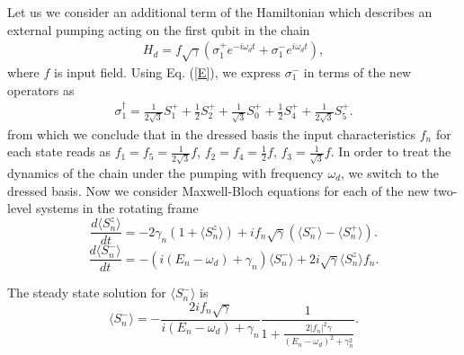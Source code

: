 \documentclass[%
 aps, pra,
 amsmath,amssymb,
 preprint,%
superscriptaddress
]{revtex4-2}
\begin{document}
Let us we consider an additional term of the Hamiltonian which
describes an external pumping acting on the first qubit in the
chain
\begin{eqnarray}
H_{d} =f \sqrt{\gamma}(\sigma_1^{+} e^{-i \omega_d t} + \sigma_1^{-} e^{i \omega_d t}),
\label{Hint}
\end{eqnarray}
where $f$ is input field. Using Eq. (\ref{E}), we express $\sigma_1^{-}$ in terms of the new operators
as
\begin{eqnarray}
\sigma_1^{\dagger}=\frac{1}{2\sqrt{3}}S_1^{+} + \frac{1}{2}S_2^{+} + \frac{1}{\sqrt{3}}S_0^{+} + \frac{1}{2}S_4^{+} + \frac{1}{2\sqrt{3}}S_5^{+}.
\label{sigma1}
\end{eqnarray}
from which we conclude that in the dressed basis the input
characteristics $f_{n}$ for each state reads as $f_{1}=f_{5}=\frac{1}{2\sqrt{3}}f$, $f_{2}=f_{4}=\frac{1}{2}f$, $f_{3}=\frac{1}{\sqrt{3}}f$. In order to treat the dynamics of the chain under the pumping with frequency $\omega_d$,
we switch to the
dressed basis. Now we consider Maxwell-Bloch equations for each of the new
two-level systems in the rotating frame
\begin{equation}
\frac{d \langle S_n^{z} \rangle}{dt} = -2\gamma_n \left(1+
\langle S_n^{z} \rangle \right) + i f_{n}
\sqrt{\gamma}\left(\langle S_n^{-} \rangle  -
\langle S_n^{+} \rangle \right). \label{sigmaz}
\end{equation}
\begin{equation}
\frac{d \langle S_n^{-} \rangle}{dt} = -\left(i (E_n-\omega_d) +
\gamma_n\right) \langle S_n^{-} \rangle + 2 i
\sqrt{\gamma} \langle S_n^{z} \rangle f_n.
\label{sigmaminus}
\end{equation}

The steady state solution for $\langle S_n^{-} \rangle$ is
\begin{equation}
\langle S_n^{-} \rangle  = -
\frac{2i f_{n} \sqrt{\gamma}}{i\left(E_n - \omega_d\right) + \gamma_n}
\frac{1}{1+ \frac{2 |f_{n}|^2 \gamma}{\left(E_n - \omega_d\right)^2 +
		\gamma_n^2}}. \label{sigmaminusst}
\end{equation}
\end{document}
